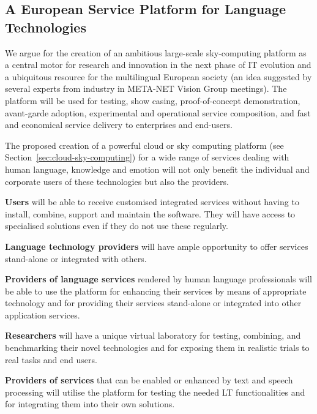 \documentclass[10pt, plain]{../../metanetpaper}
\begin{document}
\begin{multicols}{2}
\subsection{A European Service Platform for Language Technologies}
\label{sec:europ-service-platform}

%

We argue for the creation of an ambitious large-scale sky-computing platform as a central motor for research and innovation in the next phase of IT evolution and a ubiquitous resource for the multilingual European society (an idea suggested by several experts from industry in META-NET Vision Group meetings). The platform will be used for testing, show casing, proof-of-concept demonstration, avant-garde adoption, experimental and operational service composition, and fast and economical service delivery to enterprises and end-users.
 
The proposed creation of a powerful cloud or sky computing platform (see Section~\ref{sec:cloud-sky-computing}) for a wide range of services dealing with human language, knowledge and emotion will not only benefit the individual and corporate users of these technologies but also the providers.
 
\textbf{Users} will be able to receive customised integrated services without having to install, combine, support and maintain the software. They will have access to specialised solutions even if they do not use these regularly.
 
\textbf{Language technology providers} will have ample opportunity to offer services stand-alone or integrated with others.
 
\textbf{Providers of language services} rendered by human language professionals will be able to use the platform for enhancing their services by means of appropriate technology and for providing their services stand-alone or integrated into other application services.
 
\textbf{Researchers} will have a unique virtual laboratory for testing, combining, and benchmarking their novel technologies and for exposing them in realistic trials to real tasks and end users.
 
\textbf{Providers of services} that can be enabled or enhanced by text and speech processing will utilise the platform for testing the needed LT functionalities and for integrating them into their own solutions.


\end{multicols}
\end{document}
